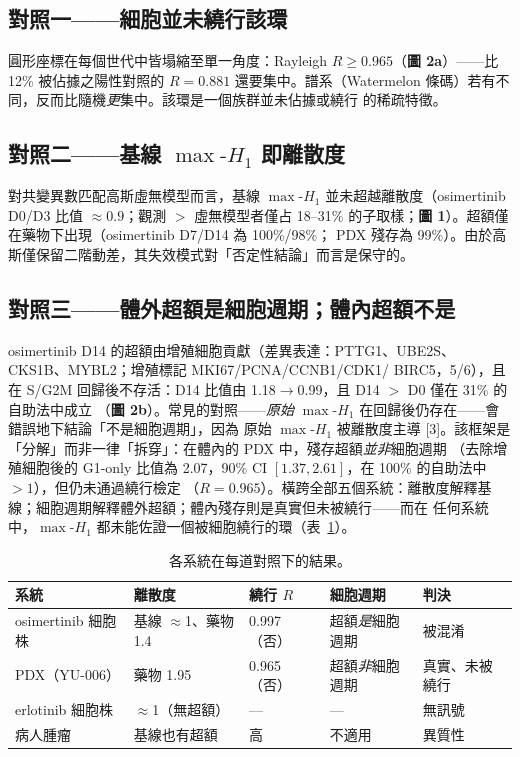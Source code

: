 \documentclass[11pt,a4paper]{article}
\newcommand{\maxh}{\ensuremath{\max\text{-}H_1}}
\begin{document}
\subsection*{對照一——細胞並未繞行該環}
圓形座標在每個世代中皆塌縮至單一角度：Rayleigh $R \ge 0.965$（\textbf{圖 2a}）——比 12\% 被佔據之陽性對照的
$R=0.881$ 還要集中。譜系（Watermelon 條碼）若有不同，反而比隨機\emph{更}集中。該環是一個族群並未佔據或繞行
的稀疏特徵。

\subsection*{對照二——基線 \maxh{} 即離散度}
對共變異數匹配高斯虛無模型而言，基線 \maxh{} 並未超越離散度（osimertinib D0/D3 比值 $\approx 0.9$；觀測
$>$ 虛無模型者僅占 18--31\% 的子取樣；\textbf{圖 1}）。超額僅在藥物下出現（osimertinib D7/D14 為 100\%/98\%；
PDX 殘存為 99\%）。由於高斯僅保留二階動差，其失效模式對「否定性結論」而言是保守的。

\subsection*{對照三——體外超額是細胞週期；體內超額不是}
osimertinib D14 的超額由增殖細胞貢獻（差異表達：PTTG1、UBE2S、CKS1B、MYBL2；增殖標記 MKI67/PCNA/CCNB1/CDK1/
BIRC5，5/6），且在 S/G2M 回歸後不存活：D14 比值由 1.18$\to$0.99，且 D14 $>$ D0 僅在 31\% 的自助法中成立
（\textbf{圖 2b}）。常見的對照——\emph{原始} \maxh{} 在回歸後仍存在——會錯誤地下結論「不是細胞週期」，因為
原始 \maxh{} 被離散度主導 [3]。該框架是「分解」而非一律「拆穿」：在體內的 PDX 中，殘存超額\emph{並非}細胞週期
（去除增殖細胞後的 G1-only 比值為 2.07，90\% CI $[1.37,2.61]$，在 100\% 的自助法中 $>1$），但仍未通過繞行檢定
（$R=0.965$）。橫跨全部五個系統：離散度解釋基線；細胞週期解釋體外超額；體內殘存則是真實但未被繞行——而在
任何系統中，\maxh{} 都未能佐證一個被細胞繞行的環（表~\ref{tab:summary}）。

\begin{table}[h]\centering\small
\caption{各系統在每道對照下的結果。}\label{tab:summary}
\begin{tabular}{@{}lllll@{}}\toprule
系統 & 離散度 & 繞行 $R$ & 細胞週期 & 判決 \\\midrule
osimertinib 細胞株 & 基線 $\approx$1、藥物 1.4 & 0.997（否） & 超額\emph{是}細胞週期 & 被混淆 \\
PDX（YU-006） & 藥物 1.95 & 0.965（否） & 超額\emph{非}細胞週期 & 真實、未被繞行 \\
erlotinib 細胞株 & $\approx$1（無超額） & --- & --- & 無訊號 \\
病人腫瘤 & 基線也有超額 & 高 & 不適用 & 異質性 \\\bottomrule
\end{tabular}
\end{table}
\end{document}
